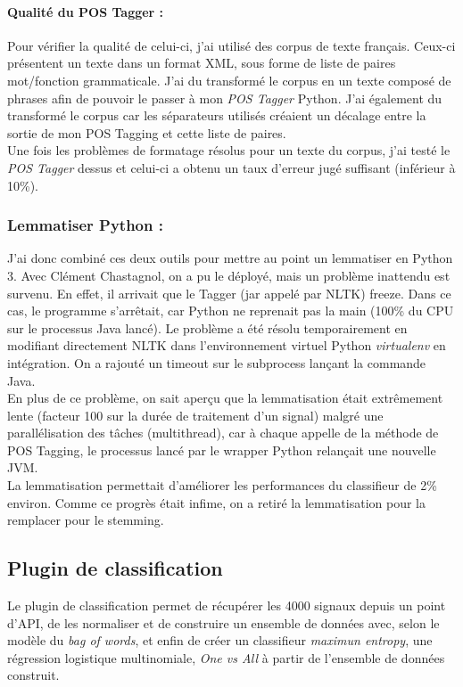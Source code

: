             \paragraph{Qualité du POS Tagger :}
                Pour vérifier la qualité de celui-ci, j'ai utilisé des corpus de texte français. Ceux-ci présentent un texte dans un format XML, sous forme de liste de paires mot/fonction grammaticale. J'ai du transformé le corpus en un texte composé de phrases afin de pouvoir le passer à mon \textit{POS Tagger} Python. J'ai également du transformé le corpus car les séparateurs utilisés créaient un décalage entre la sortie de mon POS Tagging et cette liste de paires.\\
                Une fois les problèmes de formatage résolus pour un texte du corpus, j'ai testé le \textit{POS Tagger} dessus et celui-ci a obtenu un taux d'erreur jugé suffisant (inférieur à 10\%).

        \subsubsection{Lemmatiser Python :}
            J'ai donc combiné ces deux outils pour mettre au point un lemmatiser en Python 3. Avec Clément Chastagnol, on a pu le déployé, mais un problème inattendu est survenu. En effet, il arrivait que le Tagger (jar appelé par NLTK) freeze. Dans ce cas, le programme s'arrêtait, car Python ne reprenait pas la main (100\% du CPU sur le processus Java lancé). Le problème a été résolu temporairement en modifiant directement NLTK dans l'environnement virtuel Python \textit{virtualenv} en intégration. On a rajouté un timeout sur le subprocess lançant la commande Java.\\

            En plus de ce problème, on sait aperçu que la lemmatisation était extrêmement lente (facteur 100 sur la durée de traitement d'un signal) malgré une parallélisation des tâches (multithread), car à chaque appelle de la méthode de POS Tagging, le processus lancé par le wrapper Python relançait une nouvelle JVM.\\

            La lemmatisation permettait d'améliorer les performances du classifieur de 2\% environ. Comme ce progrès était infime, on a retiré la lemmatisation pour la remplacer pour le stemming.


    \subsection{Plugin de classification}
        Le plugin de classification permet de récupérer les 4000 signaux depuis un point d'API, de les normaliser et de construire un ensemble de données avec, selon le modèle du \textit{bag of words}, et enfin de créer un classifieur \textit{maximun entropy}, une régression logistique multinomiale, \textit{One vs All} à partir de l'ensemble de données construit.\\

